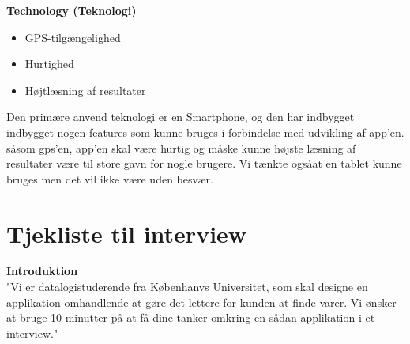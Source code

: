 \documentclass[12pt]{article}
\begin{document}
\textbf{Technology (Teknologi)}
\begin{itemize} 
\item GPS-tilgængelighed
\item Hurtighed
\item Højtlæsning af resultater
\end{itemize}
Den prim\ae re anvend teknologi er en Smartphone, og den har indbygget indbygget nogen features som kunne bruges i forbindelse med udvikling
af app'en. s\aa  som gps'en, app'en skal v\ae re hurtig og m\aa ske kunne h\o jste l\ae sning af resultater v\ae re til store gavn for nogle 
brugere. Vi t\ae nkte ogs\aa  at en tablet kunne bruges men det vil ikke v\ae re uden besv\ae r.   
\newpage

\section{Tjekliste til interview}
\textbf{Introduktion}\\
"Vi er datalogistuderende fra Københanvs Universitet, som skal designe en applikation omhandlende at gøre det lettere for kunden at finde varer. Vi ønsker at bruge 10 minutter på at få dine tanker omkring en sådan applikation  i et interview."
 
\end{document}
